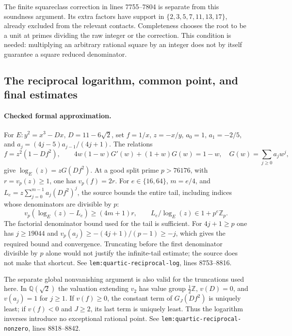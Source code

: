 The finite squareclass correction in lines 7755--7804 is separate from
this soundness argument.  Its extra factors have support in
$\{2,3,5,7,11,13,17\}$, already excluded from the relevant contacts.
Completeness chooses the root to be a unit at primes dividing the raw
integer or the correction.  This condition is needed: multiplying an
arbitrary rational square by an integer does not by itself guarantee a
square reduced denominator.

\subsection{The reciprocal logarithm, common point, and final estimates}

\paragraph{Checked formal approximation.}
For $E:y^2=x^3-Dx$, $D=11-6\sqrt2$, set $f=1/x$, $z=-x/y$,
$a_0=1$, $a_1=-2/5$, and
$a_j=(4j-5)a_{j-1}/(4j+1)$.  The relations
\[
 f=z^2(1-Df^2),\qquad
 4w(1-w)G'(w)+(1+w)G(w)=1-w,
 \quad G(w)=\sum_{j\ge0}a_jw^j,
\]
give $\log_E(z)=zG(Df^2)$.  At a good split prime $p>76176$,
with $r=v_p(z)\ge1$, one has $v_p(f)=2r$.
For $e\in\{16,64\}$, $m=e/4$, and
$L_e=z\sum_{j=0}^{m-1}a_j(Df^2)^j$, the source bounds the entire
tail, including indices whose denominators are divisible by $p$:
\[
 v_p(\log_E(z)-L_e)\ge(4m+1)r,
 \qquad L_e/\log_E(z)\in1+p^e\mathbb Z_p.
\]
The factorial denominator bound used for the tail is sufficient.
For $4j+1\ge p$ one has $j\ge19044$ and
$v_p(a_j)\ge-(4j+1)/(p-1)\ge-j$, which gives the required bound
and convergence.  Truncating before the first denominator divisible by
$p$ alone would not justify the infinite-tail estimate; the source does
not make that shortcut.  See \texttt{lem:quartic-reciprocal-log},
lines 8753--8816.

The separate global nonvanishing argument is also valid for the
truncations used here.  In $\mathbb Q(\sqrt2)$ the valuation extending
$v_2$ has value group $\frac12\mathbb Z$, $v(D)=0$, and $v(a_j)=1$
for $j\ge1$.  If $v(f)\ge0$, the constant term of $G_J(Df^2)$
is uniquely least; if $v(f)<0$ and $J\ge2$, its last term is uniquely
least.  Thus the logarithm inverses introduce no exceptional rational
point.  See \texttt{lem:quartic-reciprocal-nonzero}, lines 8818--8842.


